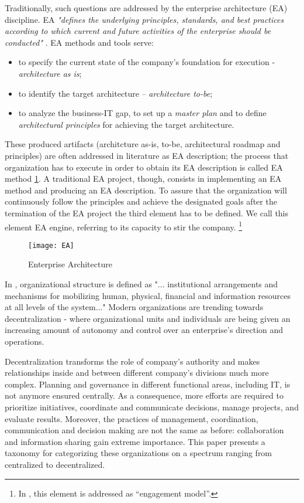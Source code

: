 Traditionally, such questions are addressed by the enterprise architecture (EA) discipline. 
EA \textit{"defines the underlying principles, standards, and best practices according to which current and future activities of the enterprise should be conducted"} \cite{jungle2004}. EA methods and tools serve:
\begin{itemize}
\item to specify the current state of the company's foundation for execution \cite{ross2006}  - \textit{architecture as is};
\item to identify the target architecture – \textit{architecture to-be};
\item to analyze the business-IT gap, to set up a \textit{master plan} and to define \textit{architectural principles} for achieving the target architecture.
\end{itemize}
These produced artifacts (architcture as-is, to-be, architectural roadmap and principles) are often addressed in literature as EA description; the process that organization has to execute in order to obtain its EA description is called EA method \ref{fig:EA_general}. A traditional EA project, though, consists in implementing an EA method and producing an EA description. To assure that the organization will continuously follow the principles and achieve the designated goals after the termination of the EA project   the third element has to be defined.  We call this element EA engine, referring to its capacity to stir the company. \footnote{In \cite{ross2006}, this element is addressed as “engagement model”.}
\begin{figure}
\centering
\texttt{[image: EA]}
\caption{Enterprise Architecture}
\label{fig:EA_general}
\end{figure}
In \cite{sachdeva1990}, organizational structure is defined as "... institutional arrangements and mechanisms for mobilizing human, physical, financial and information resources at all levels of the system..." Modern organizations are trending towards decentralization - where organizational units and individuals are being given an increasing amount of autonomy and control over an enterprise's direction and operations.

Decentralization transforms the role of company's authority and makes relationships inside and between different company's divisions much more complex. Planning and governance in different functional areas, including IT,  is not anymore ensured centrally. As a consequence, more efforts are required to prioritize initiatives, coordinate and communicate decisions, manage projects, and evaluate results. Moreover, the practices of management, coordination, communication and decision making are not the same as before: collaboration and information sharing gain extreme importance. This paper presents a taxonomy for categorizing these organizations on a spectrum ranging from centralized to decentralized. 

